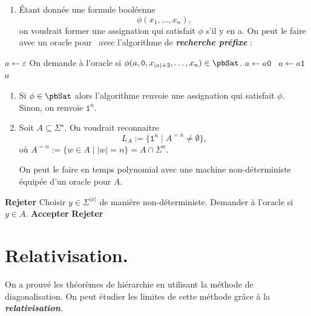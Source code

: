\documentclass[./main]{subfiles}
\begin{document}
  \begin{exm}
    \begin{enumerate}
      \item Étant donnée une formule booléenne
        \[
        \phi(x_1, \ldots, x_n)
        ,\] 
        on voudrait former une assignation qui satisfait $\phi$ s'il y en a.
        On peut le faire avec un oracle pour \pbSat\ avec l'algorithme de \textit{\textbf{recherche préfixe}} :
    \end{enumerate}

    \begin{algorithmic}
      \State $a \gets \varepsilon$
      \State On demande à l'oracle si $\phi(a, \texttt{0}, x_{|a|+2}, \ldots, x_n) \in \pbSat$.
       $a \gets a \texttt{0}$
      \Else\ $a \gets a \texttt{1}$
      \EndIf
      \EndWhile
      \State\Return $a$
    \end{algorithmic}

    \begin{enumerate}
      \item[] Si $\phi \in \pbSat$ alors l'algorithme renvoie une assignation qui satisfait $\phi$.
        Sinon, on renvoie $\texttt{1}^n$.

      \item Soit $A \subseteq \Sigma^\star$.
        On voudrait reconnaitre \[
        L_A :=  \{\texttt{1}^n  \mid A^{=n} \neq \emptyset\}
        ,\] 
        où $A^{=n} := \{w \in A  \mid |w| = n\} = A \cap \Sigma^n$.

        On peut le faire en temps polynomial avec une machine non-déterministe équipée d'un oracle pour $A$.
    \end{enumerate}

    \begin{algorithmic}
      \textbf{Rejeter}
      \EndIf
      \State Choisir $y \in \Sigma^{|x|}$ de manière non-déterministe.
      \State Demander à l'oracle si $y \in A$.
      \State \textbf{Accepter}
      \Else
      \State \textbf{Rejeter}
      \EndIf
    \end{algorithmic}
  \end{exm}

  \section{Relativisation.}

  On a prouvé les théorèmes de hiérarchie en utilisant la méthode de diagonalisation.
  On peut étudier les limites de cette méthode grâce à la \textit{\textbf{relativisation}}.
\end{document}
